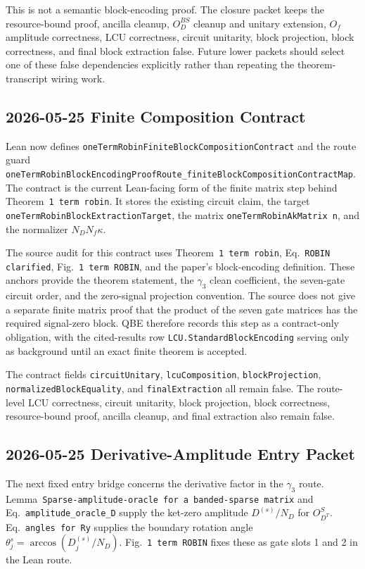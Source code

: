 This is not a semantic block-encoding proof.  The closure packet keeps the
resource-bound proof, ancilla cleanup, \(O_D^{BS}\) cleanup and unitary
extension, \(O_f\) amplitude correctness, LCU correctness, circuit unitarity,
block projection, block correctness, and final block extraction false.  Future
lower packets should select one of these false dependencies explicitly rather
than repeating the theorem-transcript wiring work.

\subsection{2026-05-25 Finite Composition Contract}

Lean now defines
\texttt{oneTermRobinFiniteBlockCompositionContract} and the route guard
\texttt{oneTermRobinBlockEncodingProofRoute\_finiteBlockCompositionContractMap}.
The contract is the current Lean-facing form of the finite matrix step behind
Theorem~\texttt{1 term robin}.  It stores the existing circuit claim, the
target \texttt{oneTermRobinBlockExtractionTarget}, the matrix
\texttt{oneTermRobinAkMatrix n}, and the normalizer \(N_DN_f\kappa\).

The source audit for this contract uses Theorem~\texttt{1 term robin},
Eq.~\texttt{ROBIN clarified}, Fig.~\texttt{1 term ROBIN}, and the paper's
block-encoding definition.  These anchors provide the theorem statement, the
\(\gamma_3\) clean coefficient, the seven-gate circuit order, and the
zero-signal projection convention.  The source does not give a separate finite
matrix proof that the product of the seven gate matrices has the required
signal-zero block.  QBE therefore records this step as a contract-only
obligation, with the cited-results row \texttt{LCU.StandardBlockEncoding}
serving only as background until an exact finite theorem is accepted.

The contract fields
\texttt{circuitUnitary}, \texttt{lcuComposition}, \texttt{blockProjection},
\texttt{normalizedBlockEquality}, and \texttt{finalExtraction} all remain
false.  The route-level LCU correctness, circuit unitarity, block projection,
block correctness, resource-bound proof, ancilla cleanup, and final extraction
also remain false.

\subsection{2026-05-25 Derivative-Amplitude Entry Packet}

The next fixed entry bridge concerns the derivative factor in the
\(\gamma_3\) route.  Lemma~\texttt{Sparse-amplitude-oracle for a
banded-sparse matrix} and Eq.~\texttt{amplitude\_oracle\_D} supply the
ket-zero amplitude \(D^{(s)}/N_D\) for \(O_{D^T}^{S}\).  Eq.~\texttt{angles
for Ry} supplies the boundary rotation angle
\(\theta_j^s = \arccos(D_j^{(s)}/N_D)\).  Fig.~\texttt{1 term ROBIN} fixes
these as gate slots 1 and 2 in the Lean route.

